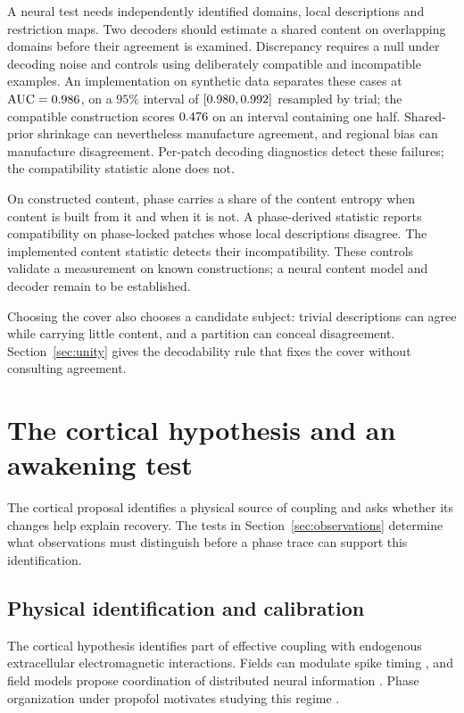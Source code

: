 \documentclass[12pt]{article}
\renewcommand{\cite}[1]{\citep{#1}}
\begin{document}
A neural test needs independently identified domains, local descriptions and restriction maps. Two decoders should estimate a shared content on overlapping domains before their agreement is examined. Discrepancy requires a null under decoding noise and controls using deliberately compatible and incompatible examples. An implementation on synthetic data separates these cases at $\mathrm{AUC}=0.986$, on a $95\%$ interval of $[0.980,0.992]$ resampled by trial; the compatible construction scores $0.476$ on an interval containing one half. Shared-prior shrinkage can nevertheless manufacture agreement, and regional bias can manufacture disagreement. Per-patch decoding diagnostics detect these failures; the compatibility statistic alone does not.

On constructed content, phase carries a share \overlapPhaseShareBuilt{} of the content entropy when content is built from it and \overlapPhaseShareFree{} when it is not. A phase-derived statistic reports compatibility on phase-locked patches whose local descriptions disagree. The implemented content statistic detects their incompatibility. These controls validate a measurement on known constructions; a neural content model and decoder remain to be established.

Choosing the cover also chooses a candidate subject: trivial descriptions can agree while carrying little content, and a partition can conceal disagreement. Section~\ref{sec:unity} gives the decodability rule that fixes the cover without consulting agreement.

\section{The cortical hypothesis and an awakening test}
\label{sec:prediction}

The cortical proposal identifies a physical source of coupling and asks whether its changes help explain recovery. The tests in Section~\ref{sec:observations} determine what observations must distinguish before a phase trace can support this identification.

\subsection{Physical identification and calibration}
\label{sec:scaling}

The cortical hypothesis identifies part of effective coupling with endogenous extracellular electromagnetic interactions. Fields can modulate spike timing \cite{frohlich2010,anastassiou2015}, and field models propose coordination of distributed neural information \cite{pinotsis2022,mcfadden2020}. Phase organization under propofol motivates studying this regime \cite{bastos2021}.
\end{document}
